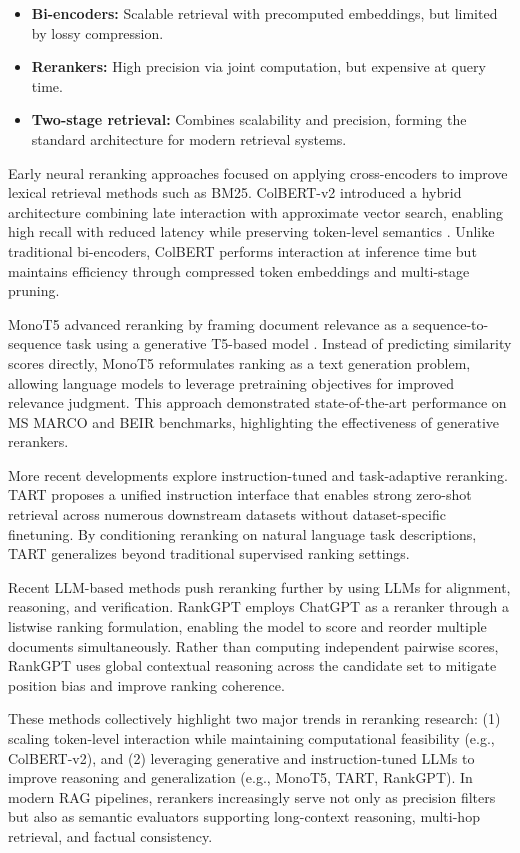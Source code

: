 \begin{itemize}
    \item \textbf{Bi-encoders:} Scalable retrieval with precomputed embeddings, but limited by lossy compression.
    \item \textbf{Rerankers:} High precision via joint computation, but expensive at query time.
    \item \textbf{Two-stage retrieval:} Combines scalability and precision, forming the standard architecture for modern retrieval systems.
\end{itemize}


Early neural reranking approaches focused on applying cross-encoders to improve lexical retrieval methods such as BM25. ColBERT-v2 introduced a hybrid architecture combining late interaction with approximate vector search, enabling high recall with reduced latency while preserving token-level semantics \cite{colbertv2}. Unlike traditional bi-encoders, ColBERT performs interaction at inference time but maintains efficiency through compressed token embeddings and multi-stage pruning.

MonoT5 advanced reranking by framing document relevance as a sequence-to-sequence task using a generative T5-based model \cite{monot5}. Instead of predicting similarity scores directly, MonoT5 reformulates ranking as a text generation problem, allowing language models to leverage pretraining objectives for improved relevance judgment. This approach demonstrated state-of-the-art performance on MS MARCO and BEIR benchmarks, highlighting the effectiveness of generative rerankers.

More recent developments explore instruction-tuned and task-adaptive reranking. TART \cite{tart} proposes a unified instruction interface that enables strong zero-shot retrieval across numerous downstream datasets without dataset-specific finetuning. By conditioning reranking on natural language task descriptions, TART generalizes beyond traditional supervised ranking settings.

Recent LLM-based methods push reranking further by using LLMs for alignment, reasoning, and verification. RankGPT \cite{rankgpt} employs ChatGPT as a reranker through a listwise ranking formulation, enabling the model to score and reorder multiple documents simultaneously. Rather than computing independent pairwise scores, RankGPT uses global contextual reasoning across the candidate set to mitigate position bias and improve ranking coherence.

These methods collectively highlight two major trends in reranking research: (1) scaling token-level interaction while maintaining computational feasibility (e.g., ColBERT-v2), and (2) leveraging generative and instruction-tuned LLMs to improve reasoning and generalization (e.g., MonoT5, TART, RankGPT). In modern RAG pipelines, rerankers increasingly serve not only as precision filters but also as semantic evaluators supporting long-context reasoning, multi-hop retrieval, and factual consistency.

